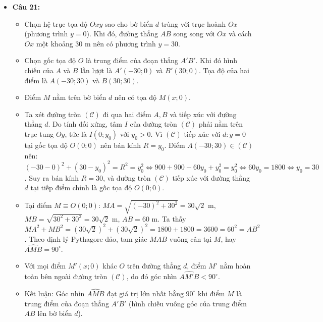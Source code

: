 \documentclass[12pt,a4paper]{article}
\begin{document}
\begin{itemize}[leftmargin=0.6cm, itemsep=3pt]
    \item \textbf{Câu 21:}
    \begin{itemize}
        \item Chọn hệ trục tọa độ $Oxy$ sao cho bờ biển $d$ trùng với trục hoành $Ox$ (phương trình $y = 0$). Khi đó, đường thẳng $AB$ song song với $Ox$ và cách $Ox$ một khoảng $30\text{ m}$ nên có phương trình $y = 30$.
        \item Chọn gốc tọa độ $O$ là trung điểm của đoạn thẳng $A'B'$. Khi đó hình chiếu của $A$ và $B$ lần lượt là $A'(-30; 0)$ và $B'(30; 0)$. Tọa độ của hai điểm là $A(-30; 30)$ và $B(30; 30)$.
        \item Điểm $M$ nằm trên bờ biển $d$ nên có tọa độ $M(x; 0)$.
        \item Ta xét đường tròn $(\mathcal{C})$ đi qua hai điểm $A, B$ và tiếp xúc với đường thẳng $d$. Do tính đối xứng, tâm $I$ của đường tròn $(\mathcal{C})$ phải nằm trên trục tung $Oy$, tức là $I(0; y_0)$ với $y_0 > 0$.
        Vì $(\mathcal{C})$ tiếp xúc với $d: y = 0$ tại gốc tọa độ $O(0; 0)$ nên bán kính $R = y_0$.
        Điểm $A(-30; 30) \in (\mathcal{C})$ nên:
        $(-30 - 0)^2 + (30 - y_0)^2 = R^2 = y_0^2 \iff 900 + 900 - 60y_0 + y_0^2 = y_0^2 \iff 60y_0 = 1800 \iff y_0 = 30$.
        Suy ra bán kính $R = 30$, và đường tròn $(\mathcal{C})$ tiếp xúc với đường thẳng $d$ tại tiếp điểm chính là gốc tọa độ $O(0; 0)$.
        \item Tại điểm $M \equiv O(0; 0)$:
        $MA = \sqrt{(-30)^2 + 30^2} = 30\sqrt{2}\text{ m}$, $MB = \sqrt{30^2 + 30^2} = 30\sqrt{2}\text{ m}$, $AB = 60\text{ m}$.
        Ta thấy $MA^2 + MB^2 = (30\sqrt{2})^2 + (30\sqrt{2})^2 = 1800 + 1800 = 3600 = 60^2 = AB^2$.
        Theo định lý Pythagore đảo, tam giác $MAB$ vuông cân tại $M$, hay $\widehat{AMB} = 90^\circ$.
        \item Với mọi điểm $M'(x; 0)$ khác $O$ trên đường thẳng $d$, điểm $M'$ nằm hoàn toàn bên ngoài đường tròn $(\mathcal{C})$, do đó góc nhìn $\widehat{AM'B} < 90^\circ$.
        \item Kết luận: Góc nhìn $\widehat{AMB}$ đạt giá trị lớn nhất bằng $90^\circ$ khi điểm $M$ là trung điểm của đoạn thẳng $A'B'$ (hình chiếu vuông góc của trung điểm $AB$ lên bờ biển $d$).
    \end{itemize}


\end{itemize}
\end{document}
